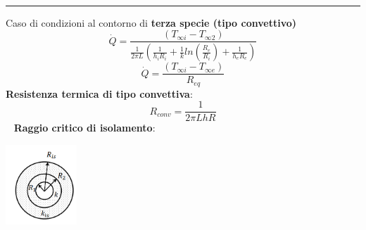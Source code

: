 \ \newline
\newline
\rule{\textwidth}{0,4pt}
Caso di condizioni al contorno di \textbf{terza specie (tipo convettivo)}
\[
    \dot{Q} = \frac{(T_{\infty i}-T_{\infty 2})}{\frac{1}{2\pi L}\left( \frac{1}{h_i R_i} + \frac{1}{k}ln\left(\frac{R_e}{R_i}\right) + \frac{1}{h_eR_e}\right)}
\] 
\[
    \dot{Q}= \frac{(T_{\infty i} - T_{\infty e})}{R_{eq}}
\]
\textbf{Resistenza termica di tipo convettiva}:
\[
    R_{conv} = \frac{1}{2\pi L h R}
\]
\ \newline
\textbf{Raggio critico di isolamento}:
\begin{center}
    \includegraphics[height=3cm]{../L10/img9.PNG}
\end{center}

